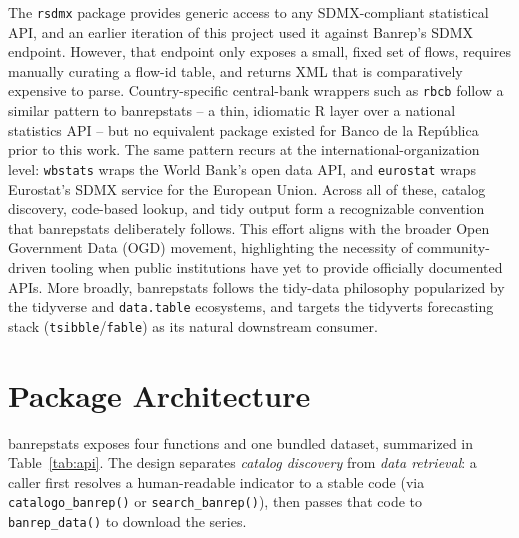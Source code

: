 \documentclass[conference]{IEEEtran}
\begin{document}
The \texttt{rsdmx} package \cite{b_rsdmx} provides generic access to any
SDMX-compliant statistical API, and an earlier iteration of this project
used it against Banrep's SDMX endpoint. However, that endpoint only
exposes a small, fixed set of flows, requires manually curating a
flow-id table, and returns XML that is comparatively expensive to parse.
Country-specific central-bank wrappers such as \texttt{rbcb}
\cite{b_rbcb} follow a similar pattern to banrepstats -- a thin,
idiomatic R layer over a national statistics API -- but no equivalent
package existed for Banco de la Rep\'ublica prior to this work. The same
pattern recurs at the international-organization level:
\texttt{wbstats} \cite{b_wbstats} wraps the World Bank's open data API,
and \texttt{eurostat} \cite{b_eurostat} wraps Eurostat's SDMX service for
the European Union. Across all of these, catalog discovery, code-based
lookup, and tidy output form a recognizable convention that banrepstats
deliberately follows. This effort aligns with the broader
Open Government Data (OGD) movement, highlighting the necessity of
community-driven tooling when public institutions have yet to provide
officially documented APIs. More broadly, banrepstats follows the
tidy-data philosophy popularized by the
tidyverse and \texttt{data.table} \cite{b_datatable} ecosystems, and
targets the tidyverts forecasting stack (\texttt{tsibble}/\texttt{fable})
\cite{b_fable} as its natural downstream consumer.

\section{Package Architecture}

banrepstats exposes four functions and one bundled dataset, summarized in
Table~\ref{tab:api}. The design separates \emph{catalog discovery} from
\emph{data retrieval}: a caller first resolves a human-readable indicator
to a stable code (via \texttt{catalogo\_banrep()} or
\texttt{search\_banrep()}), then passes that code to
\texttt{banrep\_data()} to download the series.
\end{document}
